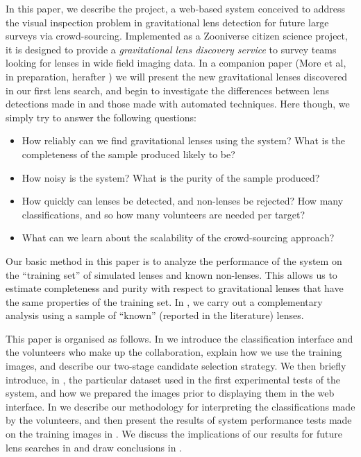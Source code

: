 \documentclass[useAMS,usenatbib,a4paper]{mn2e}
\begin{document}
In this paper, we describe the \SW project, a web-based system conceived to
address the visual inspection problem in gravitational lens detection for future
large surveys via crowd-sourcing. Implemented as a Zooniverse citizen science
project, it is designed to provide a {\it gravitational lens discovery service}
to survey teams looking for lenses in wide field imaging data. In a companion
paper (More et al, in preparation, herafter \PaperTwo) we will present the new
gravitational lenses discovered in our first lens search, and
begin to investigate the differences between lens detections made in \SW and
those made with automated techniques. Here though, we simply try to answer the
following questions:

\begin{itemize}

\item How reliably can we find gravitational lenses using the \SW
system? What is the completeness of the sample produced likely to be?

\item How noisy is the system? What is the purity of the sample
produced?

\item How quickly can lenses be detected, and non-lenses be rejected?
How many classifications, and so how many volunteers are needed per target?

\item What can we learn about the scalability of the crowd-sourcing approach?

\end{itemize}

Our basic method in this paper is to analyze the performance of the \SW system
on the ``training set'' of simulated lenses and known non-lenses. This allows us
to estimate completeness and purity with respect to gravitational lenses that
have the same properties of the training set. In \PaperTwo, we carry out a
complementary analysis using a sample of ``known'' (reported in the literature)
lenses.

This paper is organised as follows.  In  we introduce the \SW
classification interface and the volunteers who make up the \SW
collaboration,  explain how we use the training images, and describe our
two-stage candidate selection strategy. We then briefly introduce, in
, the particular dataset used in the first experimental tests
of the \SW system, and how we prepared the images prior to displaying them in
the web interface. In  we describe our methodology for
interpreting the classifications made by the volunteers, and then present the
results of system performance tests  made on the training images in
.  We discuss the implications of our results for future
lens searches in  and draw conclusions in
.
\end{document}
